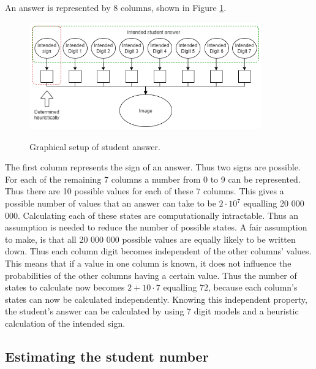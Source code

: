 An answer is represented by 8 columns, shown in Figure \ref{fig:stdAns}. \begin{figure}[b]
  \centering
  \includegraphics[width=10cm]{ans}\\
  \caption{Graphical setup of student answer.}
  \label{fig:stdAns}
\end{figure}The first column represents the sign of an answer. Thus two signs are possible. For each of the remaining 7 columns a number from 0 to 9 can be represented. Thus there are 10 possible values for each of these 7 columns. This gives a possible number of values that an answer can take to be $2\cdot 10^7$ equalling 20 000 000. Calculating each of these states are computationally intractable. Thus an assumption is needed to reduce the number of possible states. A fair assumption to make, is that all 20 000 000 possible values are equally likely to be written down. Thus each column digit becomes independent of the other columns' values. This means that if a value in one column is known, it does not influence the probabilities of the other columns having a certain value. Thus the number of states to calculate now becomes $2+10\cdot 7$ equalling $72$, because each column's states can now be calculated independently. Knowing this independent property, the student's answer can be calculated by using 7 digit models and a heuristic calculation of the intended sign.



\subsection{Estimating the student number}
\label{sec:studentNumber}

